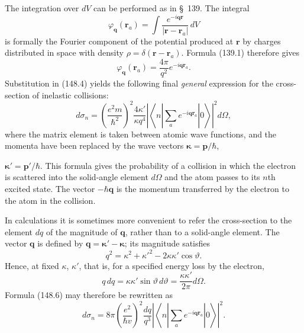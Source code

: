 The integration over $dV$ can be performed as in \S~139. The integral
\[
 \varphi_{\mathbf q}(\mathbf r_a)=\int\frac{e^{-i\mathbf q\mathbf r}}{|\mathbf r-\mathbf r_a|}\,dV
\]
is formally the Fourier component of the potential produced at $\mathbf r$
by charges distributed in space with density
$\rho=\delta(\mathbf r-\mathbf r_a)$. Formula (139.1) therefore gives
\begin{equation}
 \varphi_{\mathbf q}(\mathbf r_a)=\frac{4\pi}{q^2}e^{-i\mathbf q\mathbf r_a}.
 \tag{148.5}
\end{equation}
Substitution in (148.4) yields the following final \emph{general} expression
for the cross-section of inelastic collisions:
\begin{equation}
 d\sigma_n=\left(\frac{e^2m}{\hbar^2}\right)^2\frac{4\kappa'}{\kappa q^4}
 \left|\left\langle n\left|\sum_a e^{-i\mathbf q\mathbf r_a}\right|0\right\rangle\right|^2d\Omega,
 \tag{148.6}
\end{equation}
where the matrix element is taken between atomic wave functions, and the
momenta have been replaced by the wave vectors
$\boldsymbol{\kappa}=\mathbf p/\hbar$,

$\boldsymbol{\kappa}'=\mathbf p'/\hbar$. This formula gives the probability
of a collision in which the electron is scattered into the solid-angle
element $d\Omega$ and the atom passes to its $n$th excited state. The vector
$-\hbar\mathbf q$ is the momentum transferred by the electron to the atom in
the collision.

In calculations it is sometimes more convenient to refer the cross-section
to the element $dq$ of the magnitude of $\mathbf q$, rather than to a
solid-angle element. The vector $\mathbf q$ is defined by
$\mathbf q=\boldsymbol{\kappa}'-\boldsymbol{\kappa}$; its magnitude satisfies
\begin{equation}
 q^2=\kappa^2+\kappa'^2-2\kappa\kappa'\cos\vartheta.
 \tag{148.7}
\end{equation}
Hence, at fixed $\kappa$, $\kappa'$, that is, for a specified energy loss by
the electron,
\begin{equation}
 q\,dq=\kappa\kappa'\sin\vartheta\,d\vartheta
 =\frac{\kappa\kappa'}{2\pi}d\Omega.
 \tag{148.8}
\end{equation}
Formula (148.6) may therefore be rewritten as
\begin{equation}
 d\sigma_n=8\pi\left(\frac{e^2}{\hbar v}\right)^2\frac{dq}{q^3}
 \left|\left\langle n\left|\sum_a e^{-i\mathbf q\mathbf r_a}\right|0\right\rangle\right|^2.
 \tag{148.9}
\end{equation}


